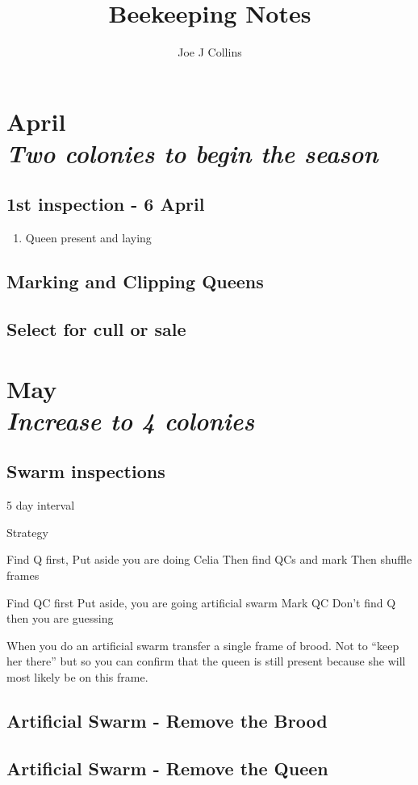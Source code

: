 \documentclass[12pt, a5paper, twoside]{book}
\title{Beekeeping Notes}
\author{Joe J Collins}
\date{ }
\newcommand\Chapter[2]{\chapter
  [#1\hfil\hbox{}\protect\linebreak{\itshape#2}]%
  {#1\\[2ex]\Large\itshape#2}%
  \markboth{\MakeUppercase{\chaptername\ \thechapter.\ #1}}{}%
}
\begin{document}
 
\maketitle


 
\Chapter{April}{Two colonies to begin the season}

\section{1st inspection - 6 April}

\begin{enumerate}
	\item{Queen present and laying}
\end{enumerate}

\section{Marking and Clipping Queens}

\section{Select for cull or sale}



\Chapter{May}{Increase to 4 colonies}

\section{Swarm inspections}

5 day interval

Strategy

Find Q first,
Put aside you are doing Celia
Then find QCs and mark
Then shuffle frames

Find QC first
Put aside, you are going artificial swarm
Mark QC
Don’t find Q then you are guessing
 
When you do an artificial swarm transfer a single frame of brood.  Not to “keep her there” but so you can confirm that the queen is still present because she will most likely be on this frame.


\section{Artificial Swarm - Remove the Brood}

\section{Artificial Swarm - Remove the Queen}
\end{document}
